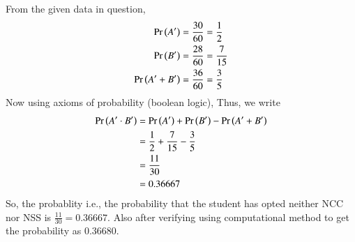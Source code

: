 \documentclass[journal]{IEEEtran}
\begin{document}
   \newline From the given data in question,
    \begin{align}
        \Pr\left(A^\prime\right) &= \frac{30}{60} = \frac{1}{2} \\
        \Pr\left(B^\prime\right) &= \frac{28}{60} = \frac{7}{15} \\
        \Pr\left(A^\prime + B^\prime\right) &= \frac{36}{60} = \frac{3}{5}    
    \end{align}
Now using axioms of probability (boolean logic),
Thus, we write
    \begin{align}
	    \Pr\left(A^\prime \cdot B^\prime\right) &= \Pr\left(A^\prime\right) +  \Pr\left(B^\prime\right) - \Pr\left(A^\prime + B^\prime\right) \\
	                                 &= \frac{1}{2} + \frac{7}{15} - \frac{3}{5} \\
	                                 &= \frac{11}{30} \\
	                                 &= 0.36667
    \end{align}
\newline So, the probablity  i.e., the probability that the student has opted neither NCC nor NSS is $\frac{11}{30} = 0.36667$.
Also after verifying using computational method to get the probability as 0.36680.
\end{document}
